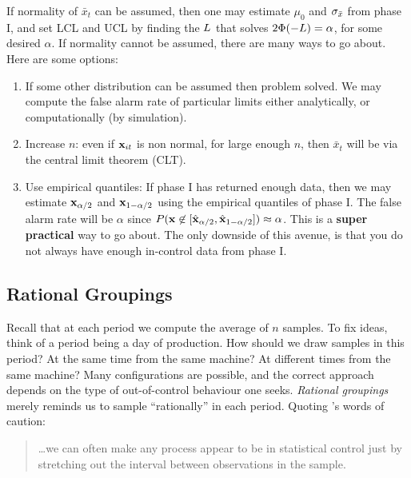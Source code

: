 \begin{extra}
If normality of $\bar{x}_t$ can be assumed, then one may estimate $\mu_0$ and $\sigma_{\bar{x}}$ from phase I, and set LCL and UCL by finding the $L$ that solves $2\Phi(-L)=\alpha$, for some desired $\alpha$. 
If normality cannot be assumed, there are many ways to go about. Here are some options:
\begin{enumerate}
\item If some other distribution can be assumed then problem solved.
We may compute the false alarm rate of particular limits either analytically, or computationally (by simulation).
\item Increase $n$: even if $\mathbf{x}_{it}$ is non normal, for large enough $n$, then $\bar{x}_t$ will be via the central limit theorem (CLT).
\item Use empirical quantiles: If phase I has returned enough data, then we may estimate 
$\mathbf{x}_{\alpha/2}$ and $\mathbf{x}_{1-\alpha/2}$ using the empirical quantiles of phase I. 
The false alarm rate will be $\alpha$ since $P(\mathbf{x} \not \in [\hat{\mathbf{x}}_{\alpha/2},\hat{\mathbf{x}}_{1-\alpha/2}]) \approx \alpha$.
This is a \textbf{super practical} way to go about. The only downside of this avenue, is that you do not always have enough in-control data from phase I.
\end{enumerate}

\end{extra}



\subsection{Rational Groupings}
\label{sec:rational_grouping}

Recall that at each period we compute the average of $n$ samples. 
To fix ideas, think of a period being a day of production. 
How should we draw samples in this period? 
At the same time from the same machine?
At different times from the same machine?
Many configurations are possible, and the correct approach depends on the type of out-of-control behaviour one seeks. 
\emph{Rational groupings} merely reminds us to sample ``rationally'' in each period. 
Quoting \cite{montgomery_introduction_2007}'s words of caution:
\begin{quotation}
\dots we can often make any process appear to be in statistical control just by stretching out the interval between observations in the sample.
\end{quotation}






